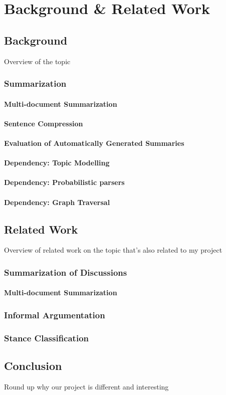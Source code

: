 \chapter{Background \& Related Work\label{chap:background-related}}
  \section{Background}
    Overview of the topic
    \subsection{Summarization}
    \subsubsection{Multi-document Summarization}
    \subsubsection{Sentence Compression}
    \subsubsection{Evaluation of Automatically Generated Summaries}
    \subsubsection{Dependency: Topic Modelling}
    \subsubsection{Dependency: Probabilistic parsers}
    \subsubsection{Dependency: Graph Traversal}
  \section{Related Work}
    Overview of related work on the topic that's also related to my project
    \subsection{Summarization of Discussions}
    \subsubsection{Multi-document Summarization}
    \subsection{Informal Argumentation}
    \subsection{Stance Classification}
  \section{Conclusion}
    Round up why our project is different and interesting
